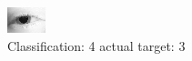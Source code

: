 \begin{figure}[h!]
\begin{center}
\includegraphics[width=0.60\columnwidth]{figures/ID168_class_4_target_3.png}
\end{center}
\caption{ Classification: 4 actual target: 3}
\label{fig:ID168_class_4_target_3}
\end{figure}
